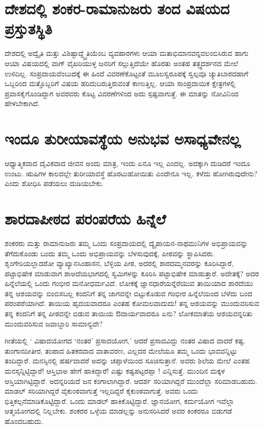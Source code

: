 \section*{ದೇಶದಲ್ಲಿ ಶಂಕರ-ರಾಮಾನುಜರು ತಂದ ವಿಷಯದ ಪ್ರಸ್ತುತಸ್ಥಿತಿ}

ದೇಶದಲ್ಲಿ ಅದ್ವೈತಿ ಮತ್ತು ವಿಶಿಷ್ಟಾದ್ದ್ವೈತಿಯೆಂಬ ವ್ಯವಹಾರಗಳು ಆಯಾ ಮತಾಭಿಮಾನವನ್ನವಲಂಬಿಸಿರುವ ಹಾಗು ಆಯಾ ವಿಷಯದಲ್ಲಿ ವಾಗ್ ವೈಖರಿಯುಳ್ಳ ಜನರಿಗೆ ಸಲ್ಲುತ್ತಿದೆಯೇ ಹೊರತು ಅಂತಹ ತತ್ತ್ವದರ್ಶನದ ಮೇಲೆ ಉಳಿದಿಲ್ಲ. ಸಂಪ್ರದಾಯವೆಂಬುದಕ್ಕೆ ಈ ಹಿಂದೆ ವಿವರಣೆಕೊಟ್ಟಂತೆ ಮೂಲಸ್ವರೂಪಕ್ಕೆ ಸ್ವಲ್ಪವೂ ಚ್ಯುತಿಬಾರದಹಾಗೆ ಒಬ್ಬರಿಂದ ಮತ್ತೊಬ್ಬರಿಗೆ ವಿಷಯ ಹರಿದುಬರುತ್ತಿರುವಂತೆ ಕಾಣುತ್ತಿಲ್ಲ. ಆಯಾ ಸಾಂಪ್ರದಾಯಿಕ ಕ್ಷೇತ್ರಗಳಲ್ಲಿ ಪ್ರವಾಸಕೈಗೊಂಡಿದ್ದಾಗ ಅವರವರು ಕೊಟ್ಟ ವಿವರಣೆಗಳಿಂದ ಅದು ಸ್ಪಷ್ಟವಾಗುತ್ತೆ. ಈ ಮಾತನ್ನು ನೋವಿನಿಂದ ಹೇಳಬೇಕಾಗಿದೆ.

\section*{ಇಂದೂ ತುರೀಯಾವಸ್ಥೆಯ ಅನುಭವ ಅಸಾಧ್ಯವೇನಲ್ಲ}

ಆಧ್ಯಾತ್ಮಿಕವಾದ ದೈವಿಕವಾದ ಜೀವನ ಅಂದು ಮಾತ್ರ, ಇಂದು ಏನೂ ಇಲ್ಲ ಎಂದಲ್ಲ. ಅದಕ್ಕಾಗಿ ದುಡಿದರೆ ಇಂದೂ ಉಂಟು. ಋಷಿಗಳ ಕಾಲದಲ್ಲೇ ತುರೀಯಾವಸ್ಥೆ ಹೊರಟುಹೋಯಿತು ಎಂದೇನೂ ಇಲ್ಲ. ಕಳೆದು ಹೋಗಿರುವುದೇನು? ಎಂದು ಶೋಧಿಸಿ ಪಡೆಯಲು ದುಡಿಯಬೇಕು.

\section*{ಶಾರದಾಪೀಠದ ಪರಂಪರೆಯ ಹಿನ್ನೆಲೆ}

ಶಂಕರರು ಮತ್ತು ರಾಮಾನುಜರು ತಮ್ಮ ಒಂದು ಸಂಪ್ರದಾಯದಲ್ಲಿ ದ್ಯೈಪಾಯನ-ನಾಥಮುನಿಗಳ ಅಭಿಪ್ರಾಯವನ್ನು ತೆಗೆದುಕೊಂಡು ಬಂದು ತಮ್ಮ ಒಂದು ಅಭಿಪ್ರಾಯವನ್ನು ಬೆಳಸುವುದಕ್ಕೆ, ಪೀಠವನ್ನು ಸ್ಥಾಪಿಸಿದರು. ಶೃಂಗೇರಿಯಲ್ಲಾದರೋ ವ್ಯಾಖ್ಯಾನಸಿಂಹಾಸನ, ಬೆಳ್ಳಿಯ ಪೀಠ, ಅದರಲ್ಲಿ ಶಾರದಮ್ಮನವರನ್ನು ಕೂರಿಸಿದ್ದಾರೆ, ಪಟ್ಟಾಭಿಷೇಕ ಮಾಡುವಾಗ ಶಾಅದೆಯಭಾಗದಲ್ಲಿ ಸ್ವಮಿಗಳನ್ನು ಕೂರಿಸಿ ಪಟ್ಟಾಭಿಷೇಕ ಮಾಡುತ್ತಾರೆ. ಅದೇತಕ್ಕೆ? ಅದರ ಹಿನ್ನೆಲೆಯಲ್ಲಿ ಒಂದು ಗಂಭೀರ ಮನೋಧರ್ಮವಿದೆ. ಲೋಕಕ್ಕೆ  ಜ್ಞಾನಧಾರೆಯನ್ನೆರೆಯುವ ತಾಯಿಯಾದ ಶಾರದೆಯು ತನ್ನ ಆಶಯವನ್ನು ಬಿಂಬಿಸಬಲ್ಲ ಕಂದನಿಗೆ ತನ್ನ ಜಾಗವನ್ನೇ ಬಿಟ್ಟುಕೊಡುವ ಗಂಭೀರ ಹಿನ್ನೆಲೆಯಿಂದ ಬೆಳೆದು ಬಂದ ಪರಂಪರೆಯಾಗಿದೆ. ತಾಯಿಯ ಹೃದಯವಾದರೂ ಎಂತಹ ಕೋಮಲವಾದುದು! ತನ್ನ ಆಶಯವನ್ನು ಮುಂದುವರಿಸುವ ತನ್ನ ಕಂದನಿಗೆ ತನ್ನ ಪೀಠವನ್ನೇ ಬಿಡುವ ತಾಯಿಯ ಔದಾರ್ಯವಾದರೂ ಏನು? ಲೋಕಮಾತೆಯ ಆಶಯವನ್ನರಿತು ಮುಂದುವರಿಸುವ ಜವಾಬ್ದಾರಿ ಸಾಮಾನ್ಯವೇ?

ಗೀತೆಯಲ್ಲಿ ` ವಿಷಾದಯೋಗದ `ನಂತರ' ಪ್ರಸಾದಯೋಗ,' ಆದರೆ ಪ್ರಸಾದವಿದ್ದು ನಂತರ ವಿಷಾದ ವಾದರೆ ಕಷ್ಟ. ತುಂಗಾನದೀತೀರ, ತಂಪಾದ ಹಿತಕರವಾದ ವಾತಾವರಣ, ಎಲ್ಲದರ ಮೇಲೆಯೂ ತಮ್ಮ ಒಂದು ಭಾವವನ್ನಿಟ್ಟು ತಂದಿದ್ದಾರೆ. ಮನಸ್ಸಿನಲ್ಲಿ ಹರ್ಷವಾದರೆ ಅದನ್ನು ಚಪ್ಪಾಳೆಯಿಂದ ಸೂಚಿಸುತ್ತಾನೆ. ಅವರು ಶಿಲೆಯ ಮೇಲೆ ಎಂತಹ ಮನಸ್ಸನ್ನಿಟ್ಟಿದ್ದಾರೆ! ಆಸ್ತಿಭಾಅ ಹೇಗೆ ಹಾಕಿದ್ದಾರೆ! ಎಷ್ಟು ಕಷ್ಟಪಟ್ಟರಪ್ಪಾ ! ಎನ್ನಿಸುತ್ತೆ. ಮುಂದಿನ ಮಕ್ಕಳ ಆಸ್ತಿಯಾಗಿಟ್ಟಿದ್ದಾರೆ. ಅದನ್ನರಿಯದೆ ಜನ ಕಂಗಾಲಾಗಿದ್ದಾರೆ. ಆದರ್ಶ ಸರಿಯಾಗಿದ್ದರೆ ಮುಂದೆಲ್ಲಾ ಸರಿಮಾಡಬಹುದು. ಮಾಡಲ್ ಸರಿಯಾಗಿದ್ದರೆ ವೈಕುಂಠವಾಗುತ್ತೆ ಇಲ್ಲದಿದ್ದರೆ ಕೈಕುಂಠವಾಗುತ್ತೆ. ಅವರು ಒಂದು ಭಿತ್ತಿಕಲ್ಪನೆಮಾಡಿಕೊಟ್ಟಿದ್ದಾರೆ. ಒಂದು ಮಾಡಲ್ ಹಾಕಿಕೊಟ್ಟಿದ್ದಾರೆ. ಜ್ಞಾನಯೋಗ, ಕರ್ಮಯೋಗ ಇವೆಲ್ಲಾ ಆತ್ಮಯೋಗದಲ್ಲಿ ನಿಲ್ಲಬೇಕು. ಶಂಕರರ ಒಳ್ಳೆಯ ಮಾಡಲ್ಲನ್ನು ಅನುಸರಿಸಿದರೆ ಅವರ ಕಿಂಕರರೂ ಬಿಡುಗಡೆ ಹೊಂದಬಹುದು.

